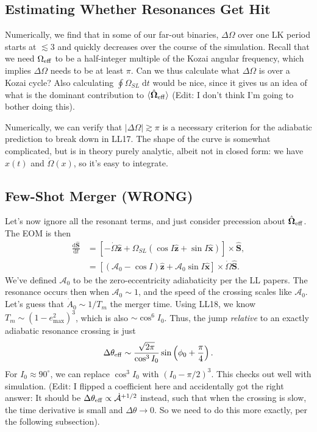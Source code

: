 \documentclass[11pt,
        usenames, %
        dvipsnames %
    ]{article}
\newcommand*{\rd}[2]{\frac{\mathrm{d}#1}{\mathrm{d}#2}}
\newcommand*{\bm}[1]{\boldsymbol{\mathbf{#1}}}
\newcommand*{\uv}[1]{\hat{\bm{#1}}}
\newcommand*{\abs}[1]{\left|#1\right|}
\newcommand*{\ev}[1]{\langle#1\rangle}
\newcommand*{\p}[1]{\left(#1\right)}
\newcommand*{\s}[1]{\left[#1\right]}
\begin{document}
\subsection{Estimating Whether Resonances Get Hit}

Numerically, we find that in some of our far-out binaries, $\Delta \Omega$ over
one LK period starts at $\lesssim 3$ and quickly decreases over the course of
the simulation. Recall that we need $\Omega_{\rm eff}$ to be a half-integer
multiple of the Kozai angular frequency, which implies $\Delta \Omega$ needs to
be at least $\pi$. Can we thus calculate what $\Delta \Omega$ is over a Kozai
cycle? Also calculating $\oint \Omega_{SL}\;\mathrm{d}t$ would be nice, since it
gives us an idea of what is the dominant contribution to $\ev{\uv{\Omega}_{\rm
eff}}$ (Edit: I don't think I'm going to bother doing this).

Numerically, we can verify that $\abs{\Delta \Omega} \gtrsim \pi$ is a necessary
criterion for the adiabatic prediction to break down in LL17. The shape of the
curve is somewhat complicated, but is in theory purely analytic, albeit not in
closed form: we have $x(t)$ and $\dot{\Omega}(x)$, so it's easy to integrate.

\subsection{Few-Shot Merger (WRONG)}

Let's now ignore all the resonant terms, and just consider precession about
$\uv{\Omega}_{\rm eff}$. The EOM is then
\begin{align}
    \rd{\uv{S}}{t} &= \s{-\dot{\Omega}\uv{z} + \Omega_{SL}\p{\cos I \uv{z} +
        \sin I \uv{x}}} \times \uv{S},\\
        &= \s{\p{\mathcal{A}_0 - \cos I}\uv{z} + \mathcal{A}_0\sin I \uv{x}}
            \times \dot{\Omega} \uv{S}.
\end{align}
We've defined $\mathcal{A}_0$ to be the zero-eccentricity adiabaticity per the
LL papers. The resonance occurs then when $\mathcal{A}_0 \sim 1$, and the speed
of the crossing scales like $\mathcal{A}_0$. Let's guess that $\dot{A}_0 \sim
1/T_m$ the merger time. Using LL18, we know $T_m \sim \p{1 - e_{\max}^2}^3$,
which is also $\sim \cos^6 I_0$. Thus, the jump \emph{relative} to an exactly
adiabatic resonance crossing is just
\begin{equation}
    \Delta \theta_{\rm eff} \sim \frac{\sqrt{2\pi}}{\cos^3 I_0}
        \sin\p{\phi_0 + \frac{\pi}{4}}.
\end{equation}
For $I_0 \approx 90^\circ$, we can replace $\cos^3 I_0$ with $\p{I_0 -
\pi/2}^3$. This checks out well with simulation. (Edit: I flipped a coefficient
here and accidentally got the right answer: It should be $\Delta \theta_{\rm
eff} \propto \dot{\mathcal{A}}^{+1/2}$ instead, such that when the crossing is
slow, the time derivative is small and $\Delta \theta \to 0$. So we need to do
this more exactly, per the following subsection).
\end{document}
